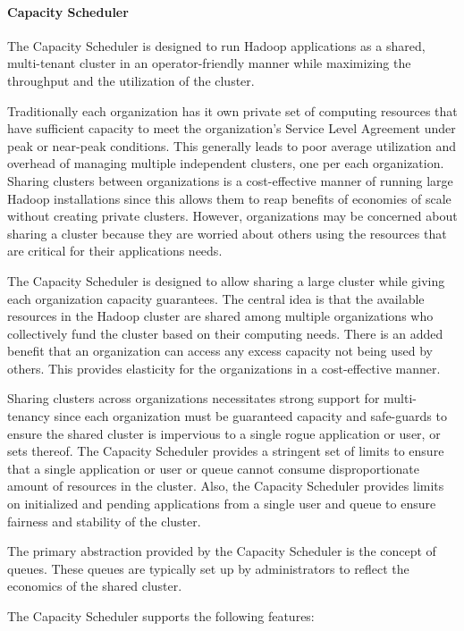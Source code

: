 \paragraph{Capacity Scheduler}

The Capacity Scheduler is designed to run Hadoop applications as a shared, multi-tenant cluster in an operator-friendly manner while maximizing the throughput and the utilization of the cluster.

Traditionally each organization has it own private set of computing resources that have sufficient capacity to meet the organization’s Service Level Agreement under peak or near-peak conditions. This generally leads to poor average utilization and overhead of managing multiple independent clusters, one per each organization. Sharing clusters between organizations is a cost-effective manner of running large Hadoop installations since this allows them to reap benefits of economies of scale without creating private clusters. However, organizations may be concerned about sharing a cluster because they are worried about others using the resources that are critical for their applications needs.

The Capacity Scheduler is designed to allow sharing a large cluster while giving each organization capacity guarantees. The central idea is that the available resources in the Hadoop cluster are shared among multiple organizations who collectively fund the cluster based on their computing needs. There is an added benefit that an organization can access any excess capacity not being used by others. This provides elasticity for the organizations in a cost-effective manner.

Sharing clusters across organizations necessitates strong support for multi-tenancy since each organization must be guaranteed capacity and safe-guards to ensure the shared cluster is impervious to a single rogue application or user, or sets thereof. The Capacity Scheduler provides a stringent set of limits to ensure that a single application or user or queue cannot consume disproportionate amount of resources in the cluster. Also, the Capacity Scheduler provides limits on initialized and pending applications from a single user and queue to ensure fairness and stability of the cluster.

The primary abstraction provided by the Capacity Scheduler is the concept of queues. These queues are typically set up by administrators to reflect the economics of the shared cluster.

The Capacity Scheduler supports the following features:

